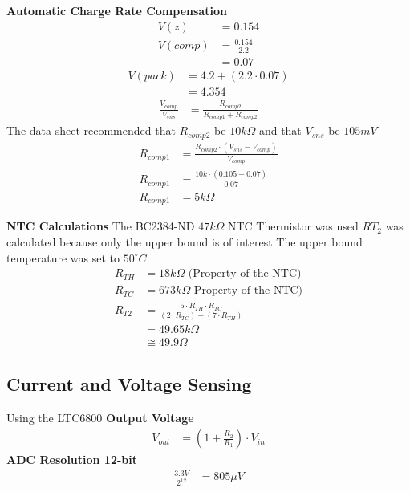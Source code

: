 \documentclass{article}
\numberwithin{figure}{section}
\numberwithin{equation}{section}
\begin{document}
{\textbf{Automatic Charge Rate Compensation}
\begin{align}
  \label{eq:comp}
  V(z) &= 0.154 \\
  V(comp) &= \frac{0.154}{2.2} \\
  &= 0.07
\end{align}
\begin{align}
  \label{eq:comp2}
  V(pack) &= 4.2 + (2.2 \cdot 0.07)\\
  &= 4.354
\end{align}
\begin{align}
  \label{eq:comp3}
  \frac{V_{comp}}{V_{sns}} &= \frac{R_{comp2}}{R_{comp1}+R_{comp2}}
\end{align}
The data sheet recommended that $R_{comp2}$ be $10k\Omega$ and that $V_{sns}$ be $105mV$
\begin{align}
  \label{eq:rcomps}
  R_{comp1}&=\frac{R_{comp2} \cdot \left(V_{sns}-V_{comp}\right)}{V_{comp}} \\
  R_{comp1}&=\frac{10k \cdot (0.105 - 0.07)}{0.07} \\
  R_{comp1}&=5k\Omega
\end{align}

\textbf{NTC Calculations}
The BC2384-ND $47k\Omega$ NTC Thermistor was used
$RT_2$ was calculated because only the upper bound is of interest
The upper bound temperature was set to $50^{\circ}C$
\begin{align}
  \label{eq:ntc}
  R_{TH} &= 18k\Omega \mbox{ (Property of the NTC)}\\
  R_{TC} &= 673k\Omega \mbox{ Property of the NTC)}\\
  R_{T2} &= \frac{5 \cdot R_{TH} \cdot R_{TC}}{(2\cdot R_{TC})-(7\cdot R_{TH})} \\
  &= 49.65k\Omega \\
  &\cong 49.9\Omega
\end{align}


\subsection{Current and Voltage Sensing}\label{app:cvsense}
Using the LTC6800
\textbf{Output Voltage}
\begin{align}
  \label{eq:vout}
  V_{out} &= \left(1+\frac{R_2}{R_1}\right)\cdot V_{in}
\end{align}
\textbf{ADC Resolution 12-bit}
\begin{align}
  \label{eq:adcres}
  \frac{3.3V}{2^{12}} &= 805\mu V
\end{align}

}
\end{document}
